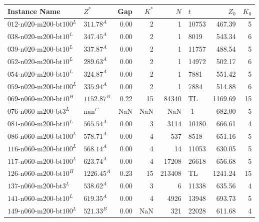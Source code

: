 \begin{table}[ht]
	\small
	\centering
	\begin{tabular}{llrrrlrr}
		\toprule
		Instance Name                  & $Z^*$              & Gap  & $K^*$ & $N$    & $t$   & $Z_0$   & $K_0$ \\
		\midrule
		$\text{012-n020-m200-bt100}^L$ & $\text{311.78}^A$  & 0.00 & 2     & 1      & 10753 & 467.39  & 5     \\
		$\text{038-n020-m200-bt10}^L$  & $\text{347.45}^A$  & 0.00 & 2     & 1      & 8019  & 543.34  & 6     \\
		$\text{039-n020-m200-bt10}^L$  & $\text{337.87}^A$  & 0.00 & 2     & 1      & 11757 & 488.54  & 5     \\
		$\text{052-n020-m200-bt10}^L$  & $\text{289.63}^A$  & 0.00 & 2     & 1      & 14972 & 502.17  & 6     \\
		$\text{054-n020-m200-bt10}^L$  & $\text{324.87}^A$  & 0.00 & 2     & 1      & 7881  & 551.42  & 5     \\
		$\text{059-n020-m200-bt100}^L$ & $\text{335.94}^A$  & 0.00 & 2     & 1      & 7884  & 514.88  & 6     \\
		$\text{069-n060-m200-bt10}^H$  & $\text{1152.87}^B$ & 0.22 & 15    & 84340  & TL    & 1169.69 & 15    \\
		$\text{076-n060-m200-bt3}^L$   & $\text{nan}^C$     & NaN  & NaN   & NaN    & -1    & 682.00  & 5     \\
		$\text{081-n060-m200-bt10}^L$  & $\text{565.54}^A$  & 0.00 & 3     & 3114   & 10180 & 666.61  & 4     \\
		$\text{086-n060-m200-bt100}^L$ & $\text{578.71}^A$  & 0.00 & 4     & 537    & 8518  & 651.16  & 5     \\
		$\text{116-n060-m200-bt100}^L$ & $\text{568.14}^A$  & 0.00 & 4     & 14     & 11053 & 630.05  & 5     \\
		$\text{117-n060-m200-bt100}^L$ & $\text{623.74}^A$  & 0.00 & 4     & 17208  & 26618 & 656.68  & 5     \\
		$\text{126-n060-m200-bt10}^H$  & $\text{1226.45}^A$ & 0.23 & 15    & 213408 & TL    & 1241.24 & 15    \\
		$\text{137-n060-m200-bt3}^L$   & $\text{538.62}^A$  & 0.00 & 3     & 6      & 11338 & 635.56  & 4     \\
		$\text{141-n060-m200-bt10}^L$  & $\text{619.35}^A$  & 0.00 & 4     & 4926   & 13948 & 693.73  & 5     \\
		$\text{149-n060-m200-bt100}^L$ & $\text{521.33}^B$  & 0.00 & NaN   & 321    & 22028 & 611.68  & 4     \\

\end{tabular}
\end{table}
